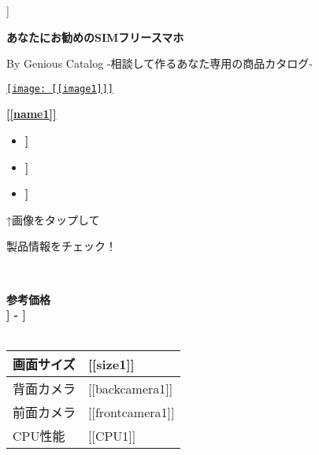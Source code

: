 \documentclass[lualatex,paper=a4,airticle]{jlreq}
\begin{document}
\begin{flushright}
  [[date]]
\end{flushright}
\begin{center}
  {\huge\textbf{あなたにお勧めのSIMフリースマホ}}\par
  By Genious Catalog  -相談して作るあなた専用の商品カタログ-
\end{center}
\noindent

\begin{minipage}[t][0.43\textheight][t]{\textwidth}
  \begin{minipage}{0.23\textwidth}
    \href{[[url1]]}{\texttt{[image: [[image1]]]}}
  \end{minipage}%
  \hfill
  \begin{minipage}{0.77\textwidth}
    \href{[[lurl1]]}{\huge{\textbf{[[name1]]}}}\par
    \begin{itemize}
      \item {\color{Purple}\mcfamily\bfseries\myfont [[description11]]}
      \item {\color{Purple}\mcfamily\bfseries\myfont [[description12]]}
      \item {\color{Purple}\mcfamily\bfseries\myfont [[description13]]}
    \end{itemize}
  \end{minipage}
  \vspace{-1\baselineskip}
  \begin{multicols}{2}
    \begin{spacing}{0.5}
      {\qquad↑画像をタップして \par \qquad 製品情報をチェック！}\\
    \end{spacing}
    {\color{red}\textbf{参考価格}}\\
    {\LARGE\color{red}\textbf{\textyen [[lprice1]] - \textyen [[hprice1]]}}\\
    \\
    \begin{minipage}{0.75\columnwidth}
      \begin{tabular}{l p{4.5cm}}
        \hline
        画面サイズ & [[size1]] \\
        \hline
        背面カメラ & [[backcamera1]] \\
        \hline
        前面カメラ & [[frontcamera1]] \\
        \hline
        CPU性能 & [[CPU1]] \\
        \hline
      \end{tabular}
    \end{minipage}
    \columnbreak


\end{multicols}
\end{minipage}
\end{document}
